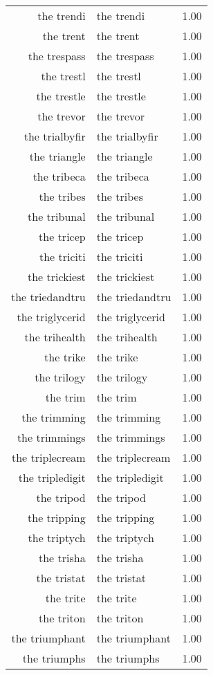 \begin{table}[ht]
\begin{tabular}{rlr}
  the trendi & the trendi & 1.00 \\ 
  the trent & the trent & 1.00 \\ 
  the trespass & the trespass & 1.00 \\ 
  the trestl & the trestl & 1.00 \\ 
  the trestle & the trestle & 1.00 \\ 
  the trevor & the trevor & 1.00 \\ 
  the trialbyfir & the trialbyfir & 1.00 \\ 
  the triangle & the triangle & 1.00 \\ 
  the tribeca & the tribeca & 1.00 \\ 
  the tribes & the tribes & 1.00 \\ 
  the tribunal & the tribunal & 1.00 \\ 
  the tricep & the tricep & 1.00 \\ 
  the triciti & the triciti & 1.00 \\ 
  the trickiest & the trickiest & 1.00 \\ 
  the triedandtru & the triedandtru & 1.00 \\ 
  the triglycerid & the triglycerid & 1.00 \\ 
  the trihealth & the trihealth & 1.00 \\ 
  the trike & the trike & 1.00 \\ 
  the trilogy & the trilogy & 1.00 \\ 
  the trim & the trim & 1.00 \\ 
  the trimming & the trimming & 1.00 \\ 
  the trimmings & the trimmings & 1.00 \\ 
  the triplecream & the triplecream & 1.00 \\ 
  the tripledigit & the tripledigit & 1.00 \\ 
  the tripod & the tripod & 1.00 \\ 
  the tripping & the tripping & 1.00 \\ 
  the triptych & the triptych & 1.00 \\ 
  the trisha & the trisha & 1.00 \\ 
  the tristat & the tristat & 1.00 \\ 
  the trite & the trite & 1.00 \\ 
  the triton & the triton & 1.00 \\ 
  the triumphant & the triumphant & 1.00 \\ 
  the triumphs & the triumphs & 1.00 \\ 

\end{tabular}
\end{table}
